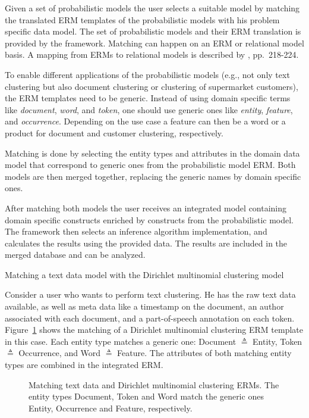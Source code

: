 Given a set of probabilistic models the user selects a suitable model by matching the translated ERM templates of the probabilistic models with his problem specific data model. The set of probabilistic models and their ERM translation is provided by the framework. Matching can happen on an ERM or relational model basis. A mapping from ERMs to relational models is described by \textcite{elmasri2007database}, pp.~218-224.

To enable different applications of the probabilistic models (e.g., not only text clustering but also document clustering or clustering of supermarket customers), the ERM templates need to be generic. Instead of using domain specific terms like \emph{document}, \emph{word}, and \emph{token}, one should use generic ones like \emph{entity}, \emph{feature}, and \emph{occurrence}. Depending on the use case a feature can then be a word or a product for document and customer clustering, respectively.

Matching is done by selecting the entity types and attributes in the domain data model that correspond to generic ones from the probabilistic model ERM. Both models are then merged together, replacing the generic names by domain specific ones.

After matching both models the user receives an integrated model containing domain specific constructs enriched by constructs from the probabilistic model. The framework then selects an inference algorithm implementation, and calculates the results using the provided data. The results are included in the merged database and can be analyzed.

\vspace*{-1em}

\begin{Example} Matching a text data model with the Dirichlet multinomial clustering model

Consider a user who wants to perform text clustering. He has the raw text data available, as well as meta data like a timestamp on the document, an author associated with each document, and a part-of-speech annotation on each token. Figure~\ref{fig:matching_clustering} shows the matching of a Dirichlet multinomial clustering ERM template in this case. Each entity type matches a generic one: Document $\triangleq$ Entity, Token $\triangleq$ Occurrence, and Word $\triangleq$ Feature. The attributes of both matching entity types are combined in the integrated ERM.

\vspace*{1em}
\begin{figure}[h!]
\centering
\scalebox{0.5}{\adjustTikzSize }
\caption[Matching text data and Dirichlet multinomial clustering ERM]{Matching text data and Dirichlet multinomial clustering ERMs. The entity types Document, Token and Word match the generic ones Entity, Occurrence and Feature, respectively.}\label{fig:matching_clustering}
\end{figure}

\end{Example}
